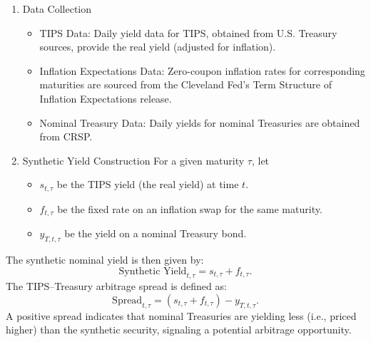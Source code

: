 \documentclass[12pt]{article}
\begin{document}
\begin{enumerate}
  \item Data Collection
  \begin{itemize}
    \item TIPS Data: Daily yield data for TIPS, obtained from U.S. Treasury sources, provide the real yield (adjusted for inflation).  
    \item Inflation Expectations Data: Zero-coupon inflation rates for corresponding maturities are sourced from the Cleveland Fed's Term Structure of Inflation Expectations release.
    \item Nominal Treasury Data: Daily yields for nominal Treasuries are obtained from CRSP.  
  \end{itemize}
  

  \item Synthetic Yield Construction
  For a given maturity \(\tau\), let
  \begin{itemize}
    \item \(s_{t,\tau}\) be the TIPS yield (the real yield) at time \(t\).
    \item  \(f_{t,\tau}\) be the fixed rate on an inflation swap for the same maturity.
    \item  \(y_{T,t,\tau}\) be the yield on a nominal Treasury bond.
  \end{itemize} 
\end{enumerate}
The synthetic nominal yield is then given by:
\[
\text{Synthetic Yield}_{t,\tau} = s_{t,\tau} + f_{t,\tau}.
\]
The TIPS–Treasury arbitrage spread is defined as:
\[
\text{Spread}_{t,\tau} = (s_{t,\tau} + f_{t,\tau}) - y_{T,t,\tau}.
\]
A positive spread indicates that nominal Treasuries are yielding less (i.e., priced higher) than the synthetic security, 
signaling a potential arbitrage opportunity.
\end{document}
